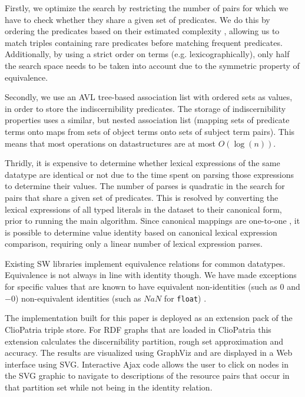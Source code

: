 Firstly, we optimize the search by restricting the number of pairs
  for which we have to check whether they share a given set of predicates.
We do this by ordering the predicates based on their
  estimated complexity \cite{Wielemaker2005},
  allowing us to match triples containing rare predicates before
  matching frequent predicates.
Additionally, by using a strict order on terms (e.g. lexicographically),
  only half the search space needs to be taken into account
  due to the symmetric property of equivalence.

Secondly, we use an AVL tree-based association list
  with ordered sets as values,
  in order to store the indiscernibility predicates.
The storage of indiscernibility properties uses a similar, but nested
  association list (mapping sets of predicate terms onto
  maps from sets of object terms onto sets of subject term pairs).
This means that most operations on datastructures are at most $O(\log(n))$.

Thridly, it is expensive to determine whether lexical expressions
  of the same datatype are identical or not
  due to the time spent on parsing those expressions
  to determine their values.
The number of parses is quadratic in the search for pairs that share
  a given set of predicates.
This is resolved by converting the lexical expressions
  of all typed literals in the dataset to their canonical form,
  prior to running the main algorithm.
Since canonical mappings are one-to-one \cite{XmlSchema2012},
  it is possible to determine value identity based on
  canonical lexical expression comparison,
  requiring only a linear number of lexical expression parses.

Existing SW libraries implement equivalence relations for common datatypes.
Equivalence is not always in line with identity though.
We have made exceptions for specific values that are known to have
  equivalent non-identities (such as $0$ and $-0$)
  non-equivalent identities (such as $NaN$ for {\small \texttt{float}})
  \cite{XSD11}.
\begin{comment}
The latter even provides a rare instance of the violation of
  definition \ref{def:identity}.
\end{comment}

The implementation built for this paper is deployed as an extension pack
  of the ClioPatria triple store.
For RDF graphs that are loaded in ClioPatria this extension calculates
  the discernibility partition, rough set approximation and accuracy.
The results are visualized using GraphViz and are displayed in a
  Web interface using SVG.
Interactive Ajax code allows the user to click on nodes in the SVG graphic
  to navigate to descriptions of the resource pairs that occur in
  that partition set while not being in the identity relation.
